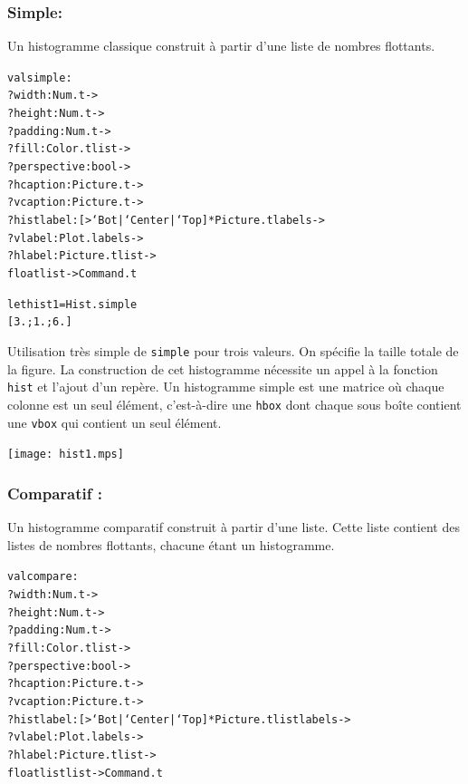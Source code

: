 \documentclass[a4paper,12pt]{article}
\begin{document}
\subsubsection{Simple:}
Un histogramme classique construit à partir d'une liste de nombres
flottants.
\begin{alltt}
  val simple :
  ?width:Num.t ->
  ?height:Num.t ->
  ?padding:Num.t ->
  ?fill:Color.t list ->
  ?perspective: bool ->
  ?hcaption:Picture.t ->
  ?vcaption:Picture.t ->
  ?histlabel:[> `Bot | `Center | `Top ] * Picture.t labels ->
  ?vlabel:Plot.labels ->
  ?hlabel:Picture.t list -> 
  float list -> Command.t
\end{alltt}

\bigskip

\begin{minipage}{0.5\linewidth}
  \begin{alltt}
    let hist1 = Hist.simple
    [3.;1.;6.]
  \end{alltt}

  Utilisation très simple de \texttt{simple} pour trois valeurs. On spécifie la taille totale de la figure. La construction de cet histogramme nécessite un appel à la fonction \texttt{hist} et l'ajout d'un repère. Un histogramme simple est une matrice où chaque colonne est un seul élément, c'est-à-dire une \texttt{hbox} dont chaque sous boîte contient une \texttt{vbox} qui contient un seul élément.
\end{minipage}
\begin{minipage}{0.5\linewidth}
  \begin{center}
    \texttt{[image: hist1.mps]}
  \end{center}
\end{minipage}

\subsubsection{Comparatif :} 
Un histogramme comparatif construit à partir d'une liste. Cette liste
contient des listes de nombres flottants, chacune étant un histogramme.
\begin{alltt}
  val compare :
  ?width:Num.t ->
  ?height:Num.t ->
  ?padding:Num.t ->
  ?fill:Color.t list ->
  ?perspective: bool ->
  ?hcaption:Picture.t ->
  ?vcaption:Picture.t ->
  ?histlabel:[> `Bot | `Center | `Top ] * Picture.t list labels ->
  ?vlabel:Plot.labels ->
  ?hlabel:Picture.t list ->
  float list list -> Command.t
\end{alltt}
\end{document}
